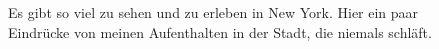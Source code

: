 \documentclass[fontsize=14pt,a4paper,headinclude,DIV=calc,automark]{scrbook}
\begin{document}
\setlength{\fboxsep}{0pt}    %
\setlength{\fboxrule}{0.2pt} %
\begin{figure}[ht]
    \raggedright
    \caption{Es gibt so viel zu sehen und zu erleben in New York. Hier ein paar Eindrücke von meinen Aufenthalten in der Stadt, die niemals schläft.}
    \label{fig:new_york_collection}
\end{figure}
\end{document}

